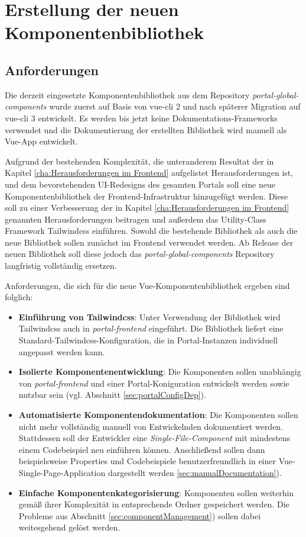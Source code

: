 \chapter{Erstellung der neuen Komponentenbibliothek}
\label{cha:Neue Komponentenbibliothek}

\section{Anforderungen}
Die derzeit eingesetzte Komponentenbibliothek aus dem Repository \textit{portal-global-components} wurde zuerst auf Basis von vue-cli 2 und nach späterer Migration auf vue-cli 3 entwickelt. Es werden bis jetzt keine Dokumentations-Frameworks verwendet und die Dokumentierung der erstellten Bibliothek wird manuell als Vue-App entwickelt.

Aufgrund der bestehenden Komplexität, die unteranderem Resultat der in Kapitel \ref{cha:Herausforderungen im Frontend} aufgelistet Herausforderungen ist, und dem bevorstehenden  UI-Redesigns des gesamten Portals soll eine neue Komponentenbibliothek der Frontend-Infrastruktur hinzugefügt werden. Diese soll zu einer Verbesserung der in Kapitel \ref{cha:Herausforderungen im Frontend} genannten Herausforderungen beitragen und außerdem das Utility-Class Framework Tailwindcss einführen. Sowohl die bestehende Bibliothek als auch die neue Bibliothek sollen zunächst im Frontend verwendet werden. Ab Release der neuen Bibliothek soll diese jedoch das \textit{portal-global-components} Repository langfristig vollständig ersetzen.

Anforderungen, die sich für die neue Vue-Komponentenbibliothek ergeben sind folglich:
\begin{itemize}
    \item \textbf{Einführung von Tailwindcss}: Unter Verwendung der Bibliothek wird Tailwindcss auch in \textit{portal-frontend} eingeführt. Die Bibliothek liefert eine Standard-Tailwindcss-Konfiguration, die in Portal-Instanzen individuell angepasst werden kann.
    \item \textbf{Isolierte Komponentenentwicklung}: Die Komponenten sollen unabhängig von \textit{portal-frontend} und einer Portal-Koniguration entwickelt werden sowie nutzbar sein (vgl. Abschnitt \ref{sec:portalConfigDep}).
    \item \textbf{Automatisierte Komponentendokumentation}: Die Komponenten sollen nicht mehr vollständig manuell von Entwickelnden dokumentiert werden. Stattdessen soll der Entwickler eine \textit{Single-File-Component} mit mindestens einem Codebeispiel neu einführen können. Anschließend sollen dann beispielsweise Properties und Codebeispiele benutzerfreundlich in einer Vue-Single-Page-Application dargestellt werden \ref{sec:manualDocumentation}).
    \item \textbf{Einfache Komponentenkategorisierung}: Komponenten sollen weiterhin gemäß ihrer Komplexität in entsprechende Ordner gespeichert werden. Die Probleme aus Abschnitt \ref{sec:componentManagement}) sollen dabei weitesgehend gelöst werden.
  \end{itemize}


